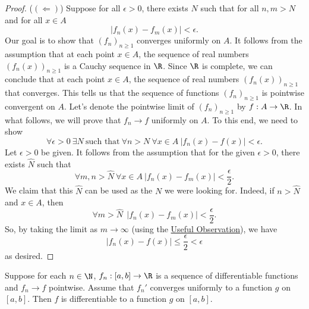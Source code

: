\begin{proof}
    (\( (\Longleftarrow) \)) Suppose for all \( \epsilon > 0  \), there exists \( N  \) such that for all \( n,m > N  \) and for all \( x \in A  \)
    \[  | {f}_{n}(x) - {f}_{m}(x) |  < \epsilon. \]
    Our goal is to show that \( ({f}_{n})_{n \geq 1 } \) converges uniformly on \( A  \). It follows from the assumption that at each point \( x \in A  \), the sequence of real numbers \( ({f}_{n}(x))_{n \geq 1 } \) is a Cauchy sequence in \( \R  \). Since \( \R \) is complete, we can conclude that at each point \( x \in A  \), the sequence of real numbers \( ({f}_{n}(x))_{n \geq 1} \) that converges. This tells us that the sequence of functions \( ({f}_{n})_{n \geq 1 } \) is pointwise convergent on \( A  \). Let's denote the pointwise limit of \( ({f}_{n})_{n \geq 1 }  \) by \( f: A \to \R  \). In what follows, we will prove that \( {f}_{n} \to f  \) uniformly on \( A  \). To this end, we need to show   
    \[  \forall \epsilon > 0  \ \exists N  \ \text{such that} \ \forall n > N \ \forall x \in A \ | {f}_{n}(x) - f(x) |  < \epsilon. \] 
    Let \( \epsilon > 0  \) be given. It follows from the assumption that for the given \( \epsilon> 0  \), there exists \( \hat{N} \) such that 
    \[  \forall m,n > \hat{N} \ \forall x \in A \ | {f}_{n}(x) - {f}_{m}(x) |  < \frac{ \epsilon }{ 2 }. \]
    We claim that this \( \hat{N} \) can be used as the \( N  \) we were looking for. Indeed, if \( n > \hat{N} \) and \( x \in A  \), then 
    \[  \forall m > \hat{N} \ \ | {f}_{n}(x) - {f}_{m}(x) |  < \frac{ \epsilon }{ 2 }.  \]
So, by taking the limit as \( m \to \infty   \) (using the {\hyperref[Useful Observation]{Useful Observation}}), we have 
\[ | {f}_{n}(x) - f(x) |  \leq \frac{ \epsilon }{ 2 }  < \epsilon  \]
as desired.
\end{proof}

\begin{theorem}\label{Uniform convergence and differentiability}
    Suppose for each \( n \in \N \), \( {f}_{n} : [a,b] \to \R  \) is a sequence of differentiable functions and \( {f}_{n} \to f  \) pointwise. Assume that \( {f}_{n}'  \) converges uniformly to a function \( g  \) on \( [a,b] \). Then \( f \) is differentiable to a function \( g  \) on \( [a,b] \).
\end{theorem}

